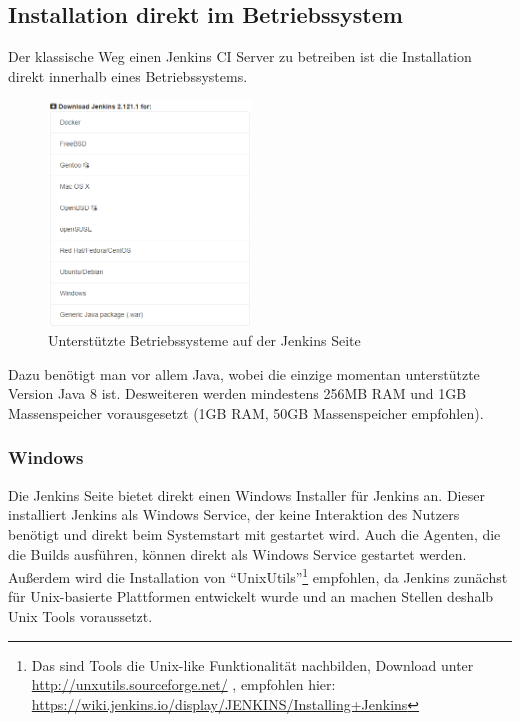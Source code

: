 \subsection{Installation direkt im Betriebssystem}
Der klassische Weg einen Jenkins CI Server zu betreiben ist die Installation direkt innerhalb eines Betriebssystems.
\begin{figure}
  \begin{center}
    \includegraphics[width=0.48\textwidth]{./Images/Jenkins_installation_and_setup.png}
  \end{center}
  \caption{Unterstützte Betriebssysteme auf der Jenkins Seite\cite{jenkins-download}}\label{fig:Jenkins_installation_and_setup}
\end{figure}
Dazu benötigt man vor allem Java, wobei die einzige momentan unterstützte Version Java 8 ist.\cite{jenkins-java} Desweiteren werden mindestens 256MB RAM und 1GB  Massenspeicher vorausgesetzt (1GB RAM, 50GB Massenspeicher empfohlen).\cite{jenkins-installing}
\subsubsection*{Windows}
Die Jenkins Seite bietet direkt einen Windows Installer für Jenkins an. Dieser installiert Jenkins als Windows Service, der keine Interaktion des Nutzers benötigt und direkt beim Systemstart mit gestartet wird. Auch die Agenten, die die Builds ausführen, können direkt als Windows Service gestartet werden. \cite{jenkins-windows}\\
Außerdem wird die Installation von "`UnixUtils"'\footnote{Das sind Tools die Unix-like Funktionalität nachbilden, Download unter \url{http://unxutils.sourceforge.net/} , empfohlen hier: \url{https://wiki.jenkins.io/display/JENKINS/Installing+Jenkins}} empfohlen, da Jenkins zunächst für Unix-basierte Plattformen entwickelt wurde und an machen Stellen deshalb Unix Tools voraussetzt. 
